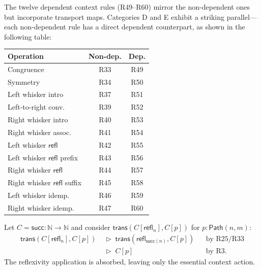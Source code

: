 \documentclass[manuscript]{BSLstyle}
\newcommand{\Path}{\mathsf{Path}}
\newcommand{\refl}{\mathsf{refl}}
\newcommand{\trans}{\mathsf{trans}}
\newcommand{\Nat}{\mathbb{N}}
\begin{document}
The twelve dependent context rules (R49--R60) mirror the non-dependent
ones but incorporate transport maps.  Categories D and E exhibit a
striking parallel---each non-dependent rule has a direct dependent
counterpart, as shown in the following table:

\begin{center}
\small
\begin{tabular}{lcc}
\toprule
\textbf{Operation} & \textbf{Non-dep.} & \textbf{Dep.} \\
\midrule
Congruence & R33 & R49 \\
Symmetry & R34 & R50 \\
Left whisker intro & R37 & R51 \\
Left-to-right conv. & R39 & R52 \\
Right whisker intro & R40 & R53 \\
Right whisker assoc. & R41 & R54 \\
Left whisker $\refl$ & R42 & R55 \\
Left whisker $\refl$ prefix & R43 & R56 \\
Right whisker $\refl$ & R44 & R57 \\
Right whisker $\refl$ suffix & R45 & R58 \\
Left whisker idemp. & R46 & R59 \\
Right whisker idemp. & R47 & R60 \\
\bottomrule
\end{tabular}
\end{center}

\begin{example}\label{ex:context-simplify}
Let $C = \mathsf{succ} : \Nat \to \Nat$ and consider
$\trans(C[\refl_n], C[p])$ for $p : \Path(n, m)$:
\begin{align*}
\trans(C[\refl_n], C[p])
  &\;\triangleright\; \trans(\refl_{\mathsf{succ}(n)}, C[p])
  && \text{by R25/R33} \\
  &\;\triangleright\; C[p]
  && \text{by R3.}
\end{align*}
The reflexivity application is absorbed, leaving only the essential
context action.
\end{example}
\end{document}
